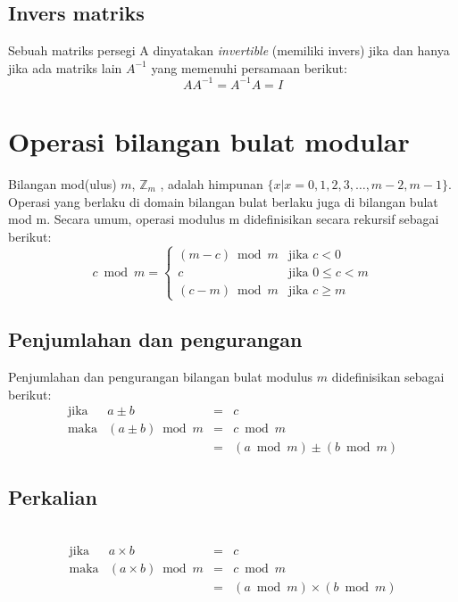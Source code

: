 \begin{enumerate}[label=\alph*.]
\subsection{Invers matriks}
Sebuah matriks persegi A dinyatakan \textit{invertible} (memiliki invers) jika dan
hanya jika ada matriks lain $A^{-1}$ yang memenuhi persamaan berikut:
\begin{equation}
	AA^{-1}=A^{-1}A=I
\end{equation}
\end{enumerate}

\section{Operasi bilangan bulat modular}
Bilangan mod(ulus) $m$, $\mathbb{Z}_m$ , adalah himpunan $\lbrace x|x = 0, 1, 2, 3, \dotsc , m - 2, m -
1 \rbrace $. Operasi yang berlaku di domain bilangan bulat berlaku juga di bilangan bulat
mod m. Secara umum, operasi modulus m didefinisikan secara rekursif sebagai
berikut:
\begin{equation}
c \bmod{m}= \begin{cases}
	(m-c)\bmod{m}	&\text{jika }c<0\\
	c				&\text{jika }0\leq c<m\\
	(c-m)\bmod{m}	&\text{jika }c\geq m
\end{cases}
\end{equation}

\subsection{Penjumlahan dan pengurangan}
Penjumlahan dan pengurangan bilangan bulat modulus $m$ didefinisikan sebagai berikut:
\begin{equation}
\begin{array}{lrcl}
	\text{jika}	& a\pm{b}			&=&c\\
	\text{maka}	& (a\pm b)\bmod m	&=&c\bmod m\\
	\;			&\;					&=&(a\bmod m)\pm (b\bmod m)
\end{array}
\end{equation}

\subsection{Perkalian}\
\begin{equation}
	\begin{array}{lrcl}
		\text{jika}	& a\times b			&=&c\\
		\text{maka}	& (a\times b)\bmod m&=&c\bmod m\\
		\;			&\;					&=&(a\bmod m)\times (b\bmod m)\\
	\end{array}
\end{equation}

